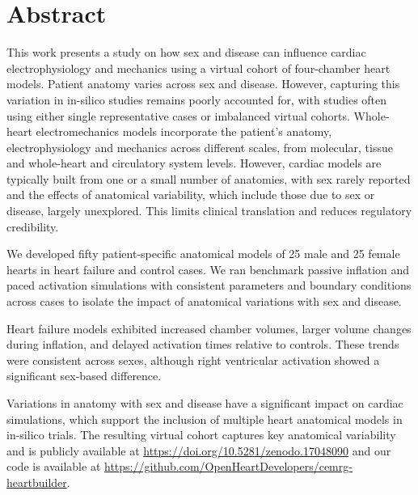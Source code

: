 \documentclass[10pt,letterpaper]{article}
\begin{document}

%
\section*{Abstract}
This work presents a study on how 
     sex and disease can influence cardiac 
    electrophysiology and mechanics using a virtual cohort of four-chamber 
    heart models.
    Patient anatomy varies across sex and disease. 
    However, capturing this variation in in-silico studies remains poorly accounted for,
    with studies often using either single representative cases or imbalanced virtual cohorts.
    Whole-heart electromechanics models incorporate the patient's anatomy, 
    electrophysiology and mechanics across different scales, from molecular, 
    tissue and whole-heart and circulatory system levels. 
    However, cardiac models are typically built from one or a small number of anatomies, 
    with sex rarely reported and the effects of anatomical variability, which include those due to 
    sex or disease, largely unexplored. 
    This limits clinical translation and reduces regulatory credibility.

    We developed fifty patient-specific anatomical models of 25 male and 25 female hearts in 
    heart failure and control cases.
    We ran benchmark passive inflation and paced activation simulations with consistent parameters and 
    boundary conditions across cases to isolate the impact of anatomical variations with sex and disease.

    Heart failure models exhibited increased chamber volumes, larger volume changes during inflation, 
    and delayed activation times relative to controls. 
    These trends were consistent across sexes, although right ventricular activation showed a significant 
    sex-based difference. 

    Variations in anatomy with sex and disease have a significant impact on cardiac simulations, 
    which support the inclusion of multiple heart anatomical models in in-silico trials.
    The resulting virtual cohort captures key anatomical variability and is publicly available at 
    \url{https://doi.org/10.5281/zenodo.17048090} and our code is available 
    at \url{https://github.com/OpenHeartDevelopers/cemrg-heartbuilder}.
\end{document}
